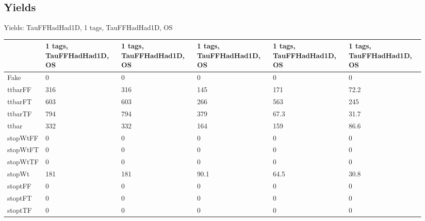 
\subsection{Yields}

\begin{frame}{Yields: TauFFHadHad1D, 1 tags, TauFFHadHad1D, OS}
\begin{center}
  \begin{tabular}{l| >{\centering\let\newline\\\arraybackslash\hspace{0pt}}m{1.4cm}| >{\centering\let\newline\\\arraybackslash\hspace{0pt}}m{1.4cm}| >{\centering\let\newline\\\arraybackslash\hspace{0pt}}m{1.4cm}| >{\centering\let\newline\\\arraybackslash\hspace{0pt}}m{1.4cm}| >{\centering\let\newline\\\arraybackslash\hspace{0pt}}m{1.4cm}}
    & 1 tags, TauFFHadHad1D, OS & 1 tags, TauFFHadHad1D, OS & 1 tags, TauFFHadHad1D, OS & 1 tags, TauFFHadHad1D, OS & 1 tags, TauFFHadHad1D, OS \\
 \hline \hline
    Fake& 0 & 0 & 0 & 0 & 0 \\
 \hline
    ttbarFF& 316 & 316 & 145 & 171 & 72.2 \\
 \hline
    ttbarFT& 603 & 603 & 266 & 563 & 245 \\
 \hline
    ttbarTF& 794 & 794 & 379 & 67.3 & 31.7 \\
 \hline
    ttbar& 332 & 332 & 164 & 159 & 86.6 \\
 \hline
    stopWtFF& 0 & 0 & 0 & 0 & 0 \\
 \hline
    stopWtFT& 0 & 0 & 0 & 0 & 0 \\
 \hline
    stopWtTF& 0 & 0 & 0 & 0 & 0 \\
 \hline
    stopWt& 181 & 181 & 90.1 & 64.5 & 30.8 \\
 \hline
    stoptFF& 0 & 0 & 0 & 0 & 0 \\
 \hline
    stoptFT& 0 & 0 & 0 & 0 & 0 \\
 \hline
    stoptTF& 0 & 0 & 0 & 0 & 0 \\
 \hline

\end{tabular}
\end{center}
\end{frame}
